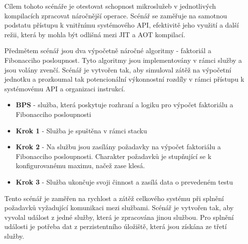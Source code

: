 
Cílem tohoto scénáře je otestovat schopnost mikroslužeb v jednotlivých kompilacích zpracovat náročnější operace. Scénář se zaměřuje na samotnou podstatu přístupu k vnitřnímu systémového API, efektivitě jeho využití a další režii, která by mohla být odlišná mezi JIT a AOT kompilací.

Předmětem scénář jsou dva výpočetně náročné algoritmy - faktoriál a Fibonacciho posloupnost. Tyto algoritmy jsou implementovány v rámci služby a jsou volány zvenčí. Scénář je vytvořen tak, aby simuloval zátěž na výpočetní jednotku a prozkoumal tak potencionální výkonnostní rozdíly v rámci přístupu k systémovému API a organizaci instrukcí.



\begin{itemize}
    \item \textbf{BPS} - služba, která poskytuje rozhraní a logiku pro výpočet faktoriálu a Fibonacciho posloupnosti
\end{itemize}


\begin{itemize}
    \item \textbf{Krok 1} - Služba je spuštěna v rámci stacku
    \item \textbf{Krok 2} - Na službu jsou zasílány požadavky na výpočet faktoriálu a Fibonacciho posloupnosti. Charakter požadavků je stupňující se k konfigurovanému maximu, načež zase klesá.
    \item \textbf{Krok 3} - Služba ukončuje svoji činnost a zasílá data o prevedeném testu
    
\end{itemize}


Tento scénář je zaměřen na rychlost a zátěž celkového systému při splnění požadavků vyžadující komunikaci mezi službami. Scénář je vytvořen tak, aby vyvolal událost z jedné služby, která je zpracována jinou službou. Pro splnění události je potřeba dat z perzistentního úložiště, která jsou získána ze třetí služby.



